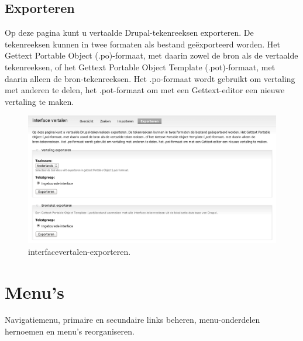 \subsection{Exporteren}  
Op deze pagina kunt u vertaalde Drupal-tekenreeksen exporteren. De tekenreeksen kunnen in twee 
formaten als bestand ge\"exporteerd worden. Het Gettext Portable Object
(.po)-formaat, met daarin zowel de bron als de vertaalde tekenreeksen, of het Gettext Portable Object Template (.pot)-formaat, 
met daarin alleen de bron-tekenreeksen. Het .po-formaat wordt gebruikt om vertaling met anderen te delen, 
het .pot-formaat om met een Gettext-editor een nieuwe vertaling te maken.
\begin{figure}[!h]
    \centering
   \includegraphics[scale=0.3,angle=0]{interfacevertalen-exporteren}
   \caption{interfacevertalen-exporteren.\label{white}}
 \end{figure}

\section{Menu's} 
Navigatiemenu,  primaire  en
secundaire links  beheren, menu-onderdelen hernoemen en
menu's reorganiseren.


